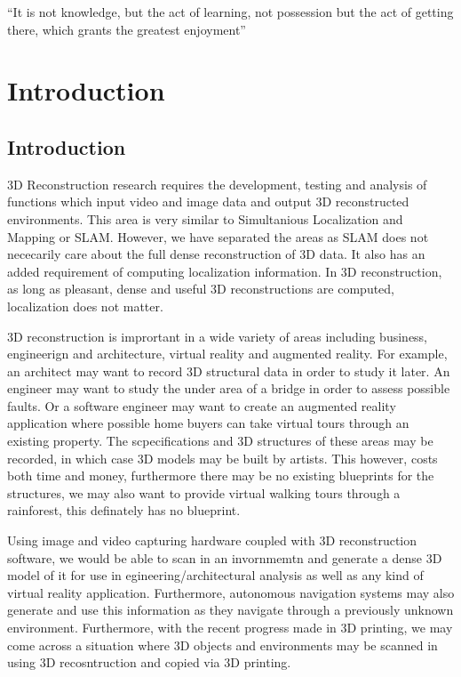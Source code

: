 \begin{savequote}[8cm]
  ``It is not knowledge, but the act of learning, not possession but the act of getting there, which grants the greatest enjoyment''
\end{savequote}
\makeatletter
\chapter{Introduction}

\section{Introduction}

3D Reconstruction research requires the development, testing and analysis of functions which input video and image data and output 3D reconstructed environments. This area is very similar to Simultanious Localization and Mapping or SLAM. However, we have separated the areas as SLAM does not nececarily care about the full dense reconstruction of 3D data. It also has an added requirement of computing localization information. In 3D reconstruction, as long as pleasant, dense and useful 3D reconstructions are computed, localization does not matter.

3D reconstruction is imprortant in a wide variety of areas including business, engineerign and architecture, virtual reality and augmented reality. For example, an architect may want to record 3D structural data in order to study it later. An engineer may want to study the under area of a bridge in order to assess possible faults. Or a software engineer may want to create an augmented reality application where possible home buyers can take virtual tours through an existing property. The scpecifications and 3D structures of these areas may be recorded, in which case 3D models may be built by artists. This however, costs both time and money, furthermore there may be no existing blueprints for the structures, we may also want to provide virtual walking tours through a rainforest, this definately has no blueprint.

Using image and video capturing hardware coupled with 3D reconstruction software, we would be able to scan in an invornmemtn and generate a dense 3D model of it for use in egineering/architectural analysis as well as any kind of virtual reality application. Furthermore, autonomous navigation systems may also generate and use this information as they navigate through a previously unknown environment. Furthermore, with the recent progress made in 3D printing, we may come across a situation where 3D objects and environments may be scanned in using 3D recosntruction and copied via 3D printing.


